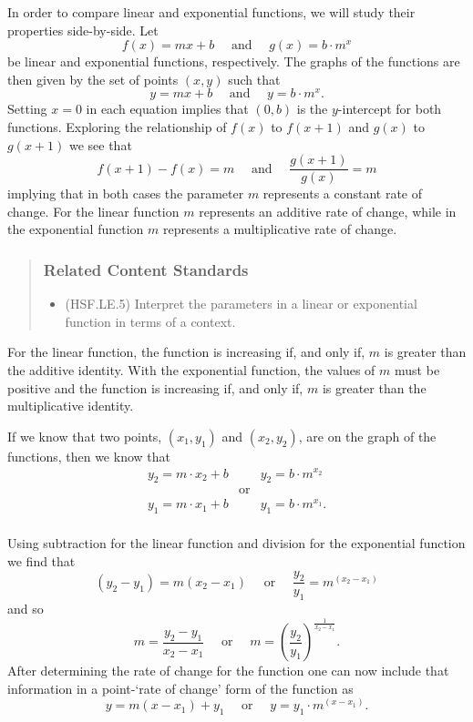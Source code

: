 \documentclass[
]{book}
\providecommand{\tightlist}{%
  \setlength{\itemsep}{0pt}\setlength{\parskip}{0pt}}
\theoremstyle{definition}
\theoremstyle{definition}
\theoremstyle{definition}
\theoremstyle{remark}
\begin{document}
In order to compare linear and exponential functions, we will study their properties side-by-side. Let
\[f(x)=mx+b \quad \mbox{ and } \quad g(x)=b\cdot m^x\] be linear and exponential functions, respectively. The graphs of the functions are then given by the set of points \((x,y)\) such that
\[y=mx+b \quad \mbox{ and } \quad y=b\cdot m^x.\] Setting \(x=0\) in each equation implies that \((0,b)\) is the \(y\)-intercept for both functions. Exploring the relationship of \(f(x)\) to \(f(x+1)\) and \(g(x)\) to \(g(x+1)\) we see that \[f(x+1)-f(x) = m \quad \mbox{ and } \quad \frac{g(x+1)}{g(x)} = m\] implying that in both cases the parameter \(m\) represents a constant rate of change. For the linear function \(m\) represents an additive rate of change, while in the exponential function \(m\) represents a multiplicative rate of change.

\begin{quote}
\hypertarget{related-content-standards-25}{%
\subsubsection*{Related Content Standards}\label{related-content-standards-25}}

\begin{itemize}
\tightlist
\item
  (HSF.LE.5) Interpret the parameters in a linear or exponential function in terms of a context.
\end{itemize}
\end{quote}

For the linear function, the function is increasing if, and only if, \(m\) is greater than the additive identity. With the exponential function, the values of \(m\) must be positive and the function is increasing if, and only if, \(m\) is greater than the multiplicative identity.

If we know that two points, \((x_1,y_1)\) and \((x_2,y_2)\), are on the graph of the functions, then we know that
\[\begin{array}{ccc}
y_2=m\cdot x_2 + b &  & y_2 = b\cdot m^{x_2} \\
 & \mbox{or} & \\
y_1=m\cdot x_1 + b &  & y_1 = b\cdot m^{x_1}.\\
\end{array}\]

Using subtraction for the linear function and division for the exponential function we find that
\[ (y_2-y_1) = m(x_2-x_1) \quad \mbox{ or } \quad \frac{y_2}{y_1} = m^{(x_2-x_1)}\] and so
\[ m= \frac{y_2-y_1}{x_2-x_1} \quad \mbox{ or } \quad m= \left( \frac{y_2}{y_1} \right)^{\frac{1}{x_2-x_1}}.\]
After determining the rate of change for the function one can now include that information in a point-`rate of change' form of the function as
\[ y= m(x-x_1)+y_1 \quad \mbox{ or } \quad y = y_1 \cdot m^{(x-x_1)}.\]
\end{document}
